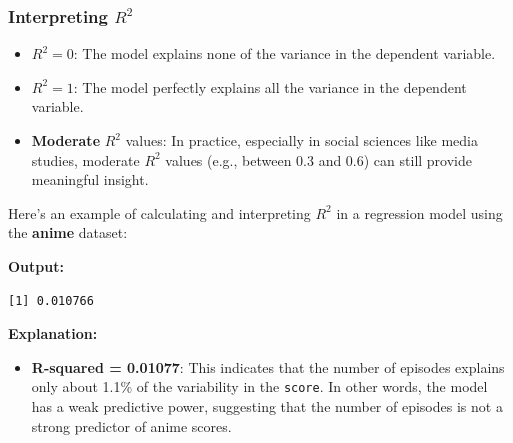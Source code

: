 \documentclass[
]{book}
\newenvironment{Shaded}{\begin{snugshade}}{\end{snugshade}}
\newcommand{\AttributeTok}[1]{\textcolor[rgb]{0.13,0.29,0.53}{#1}}
\newcommand{\CommentTok}[1]{\textcolor[rgb]{0.56,0.35,0.01}{\textit{#1}}}
\newcommand{\FunctionTok}[1]{\textcolor[rgb]{0.13,0.29,0.53}{\textbf{#1}}}
\newcommand{\NormalTok}[1]{#1}
\newcommand{\OtherTok}[1]{\textcolor[rgb]{0.56,0.35,0.01}{#1}}
\newcommand{\SpecialCharTok}[1]{\textcolor[rgb]{0.81,0.36,0.00}{\textbf{#1}}}
\providecommand{\tightlist}{%
  \setlength{\itemsep}{0pt}\setlength{\parskip}{0pt}}
\begin{document}
\subsubsection*{\texorpdfstring{Interpreting \(R^2\)}{Interpreting R\^{}2}}\label{interpreting-r2}

\begin{itemize}
\tightlist
\item
  \(R^2 = 0\): The model explains none of the variance in the dependent variable.
\item
  \(R^2 = 1\): The model perfectly explains all the variance in the dependent variable.
\item
  \textbf{Moderate} \(R^2\) values: In practice, especially in social sciences like media studies, moderate \(R^2\) values (e.g., between 0.3 and 0.6) can still provide meaningful insight.
\end{itemize}

Here's an example of calculating and interpreting \(R^2\) in a regression model using the \textbf{anime} dataset:

\begin{Shaded}
\end{Shaded}

\textbf{Output:}

\begin{verbatim}
[1] 0.010766
\end{verbatim}

\textbf{Explanation:}

\begin{itemize}
\tightlist
\item
  \textbf{R-squared = 0.01077}: This indicates that the number of episodes explains only about 1.1\% of the variability in the \texttt{score}. In other words, the model has a weak predictive power, suggesting that the number of episodes is not a strong predictor of anime scores.
\end{itemize}
\end{document}
